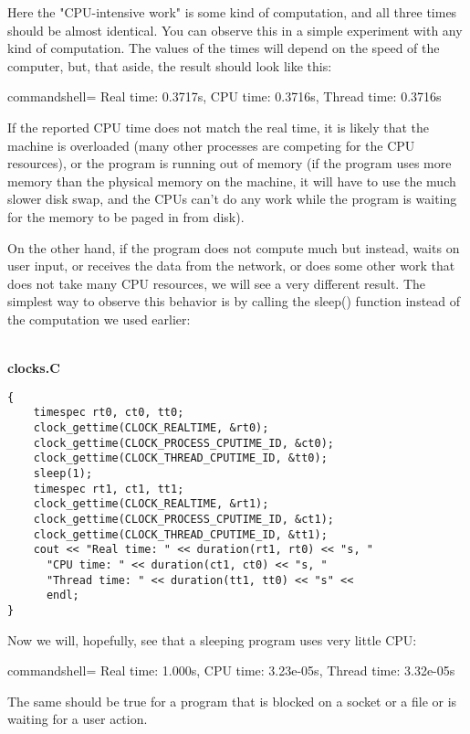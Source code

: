 Here the "CPU-intensive work" is some kind of computation, and all three times should be almost identical. You can observe this in a simple experiment with any kind of computation. The values of the times will depend on the speed of the computer, but, that aside, the result should look like this:

\begin{tcblisting}{commandshell={}}
Real time: 0.3717s, CPU time: 0.3716s, Thread time: 0.3716s
\end{tcblisting}

If the reported CPU time does not match the real time, it is likely that the machine is overloaded (many other processes are competing for the CPU resources), or the program is running out of memory (if the program uses more memory than the physical memory on the machine, it will have to use the much slower disk swap, and the CPUs can't do any work while the program is waiting for the memory to be paged in from disk).

On the other hand, if the program does not compute much but instead, waits on user input, or receives the data from the network, or does some other work that does not take many CPU resources, we will see a very different result. The simplest way to observe this behavior is by calling the sleep() function instead of the computation we used earlier:

\hspace*{\fill} \\ %
\noindent
\textbf{clocks.C}
\begin{lstlisting}[style=styleCXX]
{
	timespec rt0, ct0, tt0;
	clock_gettime(CLOCK_REALTIME, &rt0);
	clock_gettime(CLOCK_PROCESS_CPUTIME_ID, &ct0);
	clock_gettime(CLOCK_THREAD_CPUTIME_ID, &tt0);
	sleep(1);
	timespec rt1, ct1, tt1;
	clock_gettime(CLOCK_REALTIME, &rt1);
	clock_gettime(CLOCK_PROCESS_CPUTIME_ID, &ct1);
	clock_gettime(CLOCK_THREAD_CPUTIME_ID, &tt1);
	cout << "Real time: " << duration(rt1, rt0) << "s, "
	  "CPU time: " << duration(ct1, ct0) << "s, "
	  "Thread time: " << duration(tt1, tt0) << "s" <<
  	  endl;
}
\end{lstlisting}

Now we will, hopefully, see that a sleeping program uses very little CPU:

\begin{tcblisting}{commandshell={}}
Real time: 1.000s, CPU time: 3.23e-05s, Thread time: 3.32e-05s
\end{tcblisting}

The same should be true for a program that is blocked on a socket or a file or is waiting for a user action.

